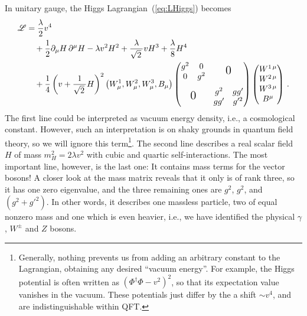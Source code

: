\documentclass[12pt]{report}
\renewcommand{\L}{\ensuremath{\mathscr{L}}}
\newcommand{\2}{\ensuremath{\sqrt{2}\,}}
\renewcommand{\L}{\ensuremath{\mathscr{L}}}
\begin{document}
{      In unitary gauge, the Higgs Lagrangian~(\ref{eq:LHiggs}) becomes
      \begin{align}
        \begin{split}\label{eq:Lunitarygauge}
          \L &= \frac{\lambda}{2} v^4 \\
          &\quad + \frac{1}{2} \partial_\mu H\, \partial^\mu H -\lambda v^2 H^2
          +\frac{\lambda}{\2} v H^3 +\frac{\lambda}{8} H^4 \\
          &\quad +\frac{1}{4}\left(v+\frac{1}{\2} H \right)^2 \left(W_\mu^1,W_\mu^2,W_\mu^3,
            B_\mu\right)   
          \begin{pmatrix} 
            \begin{matrix}
              g^2 & 0\\ 0 & g^2
            \end{matrix} & \text{\Large 0}\\
            \text{\rule[20pt]{0pt}{1pt}\Large 0} &\begin{matrix} g^2 & g g'  \\ g g' & g'^2\end{matrix}
          \end{pmatrix}
          \begin{pmatrix} W^{1\,\mu} \\W^{2\,\mu} \\W^{3\,\mu} \\  B^\mu\end{pmatrix}\,. 
        \end{split}
      \end{align}
      The first line could be interpreted as vacuum energy density, i.e., a cosmological
      constant. However, such an interpretation is on shaky grounds in quantum field theory, so
      we will ignore this term\footnote{Generally, nothing prevents us from adding an arbitrary
        constant to the Lagrangian, obtaining any desired ``vacuum energy''. For example, the Higgs
        potential is often written as $\left(\Phi^\dagger\Phi-v^2\right)^2$, so that
        its expectation value vanishes in the vacuum. These potentials just differ by the a shift
        $\sim v^4$, and are indistinguishable within QFT.}. The second line describes a real scalar
      field $H$ of mass $m_H^2=2\lambda v^2$ with cubic and quartic self-interactions. The most
      important line, however, is the last one: It contains mass terms for the vector bosons! A
      closer look at the mass matrix reveals that it only is of rank three, so it has one zero
      eigenvalue, and the three remaining ones are $g^2$, $g^2$, and $\left(g^2 +g'^2\right)$. In
      other words, it describes one massless particle, two of equal nonzero mass and one which is
      even heavier, i.e., we have identified the physical $\gamma$, $W^\pm$ and $Z$ bosons. 

}
\end{document}
